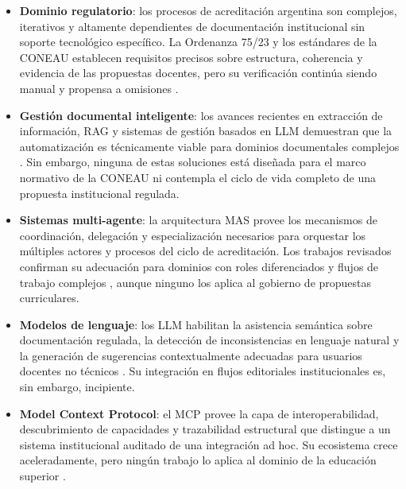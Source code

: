 \begin{itemize}
    \item \textbf{Dominio regulatorio}: los procesos de acreditación argentina son complejos, iterativos y altamente dependientes de documentación institucional sin soporte tecnológico específico. La Ordenanza 75/23 y los estándares de la CONEAU establecen requisitos precisos sobre estructura, coherencia y evidencia de las propuestas docentes, pero su verificación continúa siendo manual y propensa a omisiones \citep{ordenanza62, ordenanza75, duarte2023literature, sanchez2022acreditacion}.

    \item \textbf{Gestión documental inteligente}: los avances recientes en extracción de información, RAG y sistemas de gestión basados en LLM demuestran que la automatización es técnicamente viable para dominios documentales complejos \citep{cascavita2025sistema, paun2025implementacion, cruz2024diseno}. Sin embargo, ninguna de estas soluciones está diseñada para el marco normativo de la CONEAU ni contempla el ciclo de vida completo de una propuesta institucional regulada.

    \item \textbf{Sistemas multi-agente}: la arquitectura MAS provee los mecanismos de coordinación, delegación y especialización necesarios para orquestar los múltiples actores y procesos del ciclo de acreditación. Los trabajos revisados confirman su adecuación para dominios con roles diferenciados y flujos de trabajo complejos \citep{perez2022breve, sakurada2021multi}, aunque ninguno los aplica al gobierno de propuestas curriculares.

    \item \textbf{Modelos de lenguaje}: los LLM habilitan la asistencia semántica sobre documentación regulada, la detección de inconsistencias en lenguaje natural y la generación de sugerencias contextualmente adecuadas para usuarios docentes no técnicos \citep{garcia2025desarrollo, farsane2025automatizacion, agashe2023llm}. Su integración en flujos editoriales institucionales es, sin embargo, incipiente.

    \item \textbf{Model Context Protocol}: el MCP provee la capa de interoperabilidad, descubrimiento de capacidades y trazabilidad estructural que distingue a un sistema institucional auditado de una integración ad hoc. Su ecosistema crece aceleradamente, pero ningún trabajo lo aplica al dominio de la educación superior \citep{ehtesham2025survey, hou2025model, ray2025survey}.
\end{itemize}



